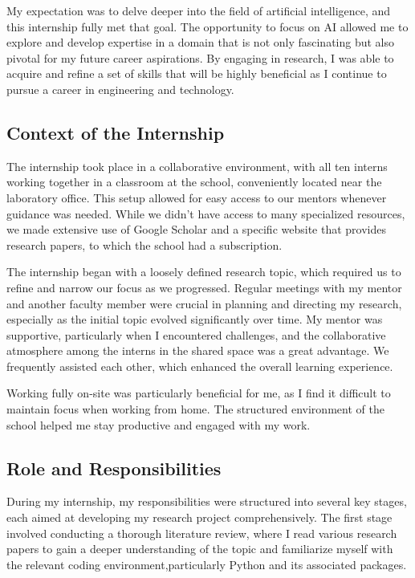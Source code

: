 My expectation was to delve deeper into the field of artificial intelligence, and this internship fully met that goal.
The opportunity to focus on AI allowed me to explore and develop expertise in a domain that is not only fascinating but
also pivotal for my future career aspirations.
By engaging in research, I was able to acquire and refine a set of skills that will be highly beneficial as I continue
to pursue a career in engineering and technology.

\subsection{Context of the Internship}\label{subsec:context-of-the-internship}
The internship took place in a collaborative environment, with all ten interns working together in a classroom at the
school, conveniently located near the laboratory office.
This setup allowed for easy access to our mentors whenever guidance was needed.
While we didn't have access to many specialized resources, we made extensive use of Google Scholar and a specific
website that provides research papers, to which the school had a subscription.

The internship began with a loosely defined research topic, which required us to refine and narrow our focus as we
progressed.
Regular meetings with my mentor and another faculty member were crucial in planning and directing my research,
especially as the initial topic evolved significantly over time.
My mentor was supportive, particularly when I encountered challenges, and the collaborative atmosphere among the interns
in the shared space was a great advantage.
We frequently assisted each other, which enhanced the overall learning experience.

Working fully on-site was particularly beneficial for me, as I find it difficult to maintain focus when working from
home.
The structured environment of the school helped me stay productive and engaged with my work.

\subsection{Role and Responsibilities}\label{subsec:role-and-responsibilities}
During my internship, my responsibilities were structured into several key stages, each aimed at developing my research
project comprehensively.
The first stage involved conducting a thorough literature review, where I read various research papers to gain a deeper
understanding of the topic and familiarize myself with the relevant coding environment,particularly Python and its
associated packages.

